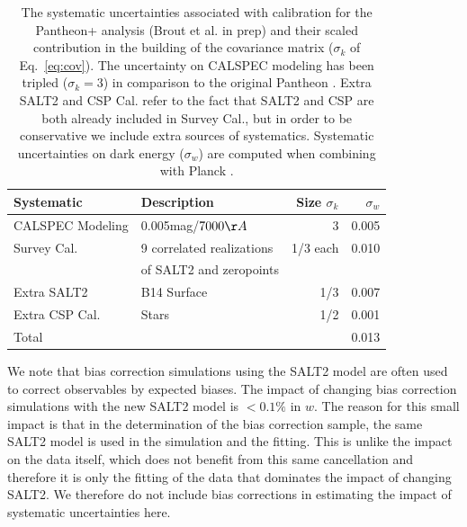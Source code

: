 \documentclass[twocolumn]{aastex63}
\newcommand{\blue}{\color{black}}
\begin{document}
\begin{table}
\centering
\begin{tabular}{llrr}
\toprule
    Systematic & Description & Size $\sigma_k$ & $\sigma_w$\\
\hline
      CALSPEC Modeling & 0.005mag/$7000\AA$&    3 & 0.005\\
      Survey Cal. & 9 correlated realizations &   1/3 each & 0.010\\
       & of SALT2 and zeropoints &   &\\
      Extra SALT2  & B14 Surface & 1/3 & 0.007\\
      Extra CSP Cal. & \cite{Stritzinger2010} Stars &  1/2 & 0.001\\
\hline
      Total & &  & 0.013\\
\end{tabular}
\caption{{\blue The systematic uncertainties associated with calibration for the Pantheon+ analysis (Brout et al. in prep) and their scaled contribution in the building of the covariance matrix ($\sigma_k$ of Eq.~\ref{eq:cov}). The uncertainty on CALSPEC modeling has been tripled ($\sigma_k=3$) in comparison to the original Pantheon \citep{Scolnic18}. Extra SALT2 and CSP Cal. refer to the fact that SALT2 and CSP are both already included in Survey Cal., but in order to be conservative we include extra sources of systematics. Systematic uncertainties on dark energy ($\sigma_w$) are computed when combining with Planck \cite{planck}.} }
\label{tab:sysdescription}
\end{table}


We note that bias correction simulations using the SALT2 model are often used to correct observables by expected biases. The impact of changing bias correction simulations with the new SALT2 model is $<0.1\%$ in $w$. The reason for this small impact is that in the determination of the bias correction sample, the same SALT2 model is used in the simulation and the fitting. {\blue This is unlike the impact on the data itself, which does not benefit from this same cancellation and therefore it is only the fitting of the data that dominates the impact of changing SALT2. We therefore do not include bias corrections in estimating the impact of systematic uncertainties here.}  
\end{document}
